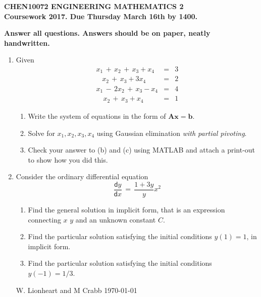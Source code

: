 \documentclass[12pt]{article}
\def\bA{\mathbf{A}}
\newcommand{\dif}{\mathsf{d}}
\begin{document}
\begin{center}{\bf\large
CHEN10072 ENGINEERING MATHEMATICS 2
\\
Coursework 2017. Due Thursday March 16th by 1400. 
}
\end{center}
\begin{center}{\bf
Answer all questions. Answers should be on paper, neatly handwritten.
}
\end{center}

\begin{enumerate}

\item 
Given
\vspace{-0.5cm}
\begin{eqnarray*}
x_1\,+\,x_2\,+\,x_3 + x_4&=&3\\
\,\,\,\,\,x_2\,+\,x_3 + 3x_4&=&2\\
x_1\,-\,2x_2\,+\,x_3 - x_4&=&4\\
\,\,\,\,\,\,x_2\,+\,x_3 + x_4&=&1
\end{eqnarray*}
            \begin{enumerate}
            \item Write the system of  equations in the form of $\bA \mathbf{x}=\mathbf{b}$.
             
            \item  Solve for $x_1,x_2,x_3,x_4$ using Gaussian elimination {\em with partial  pivoting}.
            \item Check your answer to (b) and (c) using  MATLAB and attach a print-out to show how you did this.
    \end{enumerate}
	

\item
Consider the ordinary differential equation
$$ \frac{\dif y}{\dif x}\,=\,  \frac{1+3y}{y} x^2 $$
\begin{enumerate}
\item
Find the general solution in implicit form, that is an expression connecting  $x$ $y$ and an unknown constant $C$.
\item Find the particular solution satisfying the initial conditions $y(1)=1$,  in implicit form. 
\item Find the particular solution satisfying the initial conditions $y(-1)=1/3$. 
\end{enumerate}
\vspace{5cm}

\tiny{W. Lionheart and M Crabb \today}



\end{enumerate}
\end{document}
